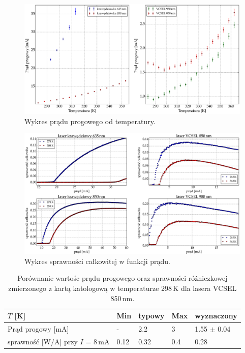 \begin{figure}
\center
  \includegraphics[scale=0.30]{plot_common/plot_temp_i_th.eps}
  \caption{Wykres prądu progowego od temperatury.}
  \label{fig:plot_temp_i_th}
\end{figure}
\begin{figure}
\center
  \includegraphics[scale=0.30]{plot_common/plot_wall_eff.eps}
  \caption{Wykres sprawności całkowitej w funkcji prądu.}
  \label{fig:plot_wall_eff}
\end{figure}
\newpage



\begin{table}[h!]
\begin{center}
\label{tab:tabela1}
\caption{Porównanie wartośc prądu progowego oraz sprawności różniczkowej zmierzonego z kartą katologową
 w temperaturze 298\,K dla lasera VCSEL 850\,nm. }
\begin{tabular}{ | C{3.5cm}|  C{1.5cm} | C{1.5cm} | C{1.5cm}| C{3.5cm}|}
\hline
$T$ [K]           &   Min  & typowy & Max   & wyznaczony        \\ \hline
Prąd progowy [mA] &  -    &  2.2    & 3    & 1.55 $\pm$ 0.04  \\ \hline
sprawność [W/A]  przy $I$ = 8\,mA   &  0.12   &  0.32   & 0.4   & 0.28      \\ \hline
\end{tabular}
\end{center}
\end{table}

